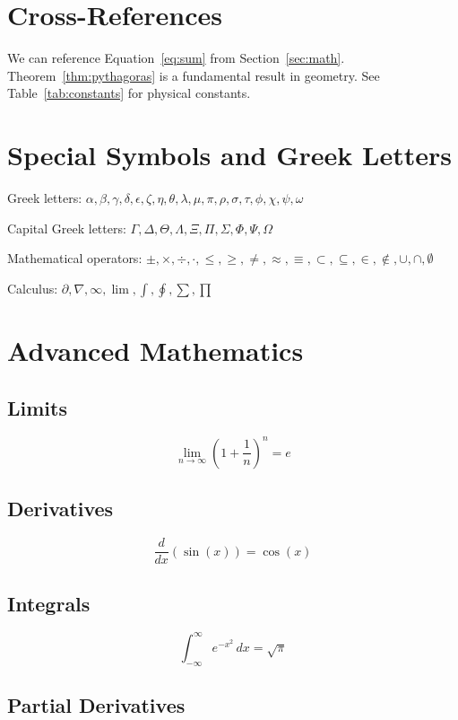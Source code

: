 \documentclass[12pt,a4paper]{article}
\theoremstyle{definition}
\theoremstyle{remark}
\begin{document}
\section{Cross-References}

We can reference Equation~\ref{eq:sum} from Section~\ref{sec:math}. Theorem~\ref{thm:pythagoras} is a fundamental result in geometry. See Table~\ref{tab:constants} for physical constants.

\section{Special Symbols and Greek Letters}

Greek letters: $\alpha, \beta, \gamma, \delta, \epsilon, \zeta, \eta, \theta, \lambda, \mu, \pi, \rho, \sigma, \tau, \phi, \chi, \psi, \omega$

Capital Greek letters: $\Gamma, \Delta, \Theta, \Lambda, \Xi, \Pi, \Sigma, \Phi, \Psi, \Omega$

Mathematical operators: $\pm, \times, \div, \cdot, \leq, \geq, \neq, \approx, \equiv, \subset, \subseteq, \in, \notin, \cup, \cap, \emptyset$

Calculus: $\partial, \nabla, \infty, \lim, \int, \oint, \sum, \prod$

\section{Advanced Mathematics}

\subsection{Limits}

\[
\lim_{n \to \infty} \left(1 + \frac{1}{n}\right)^n = e
\]

\subsection{Derivatives}

\[
\frac{d}{dx} \left( \sin(x) \right) = \cos(x)
\]

\subsection{Integrals}

\[
\int_{-\infty}^{\infty} e^{-x^2} \, dx = \sqrt{\pi}
\]

\subsection{Partial Derivatives}
\end{document}
